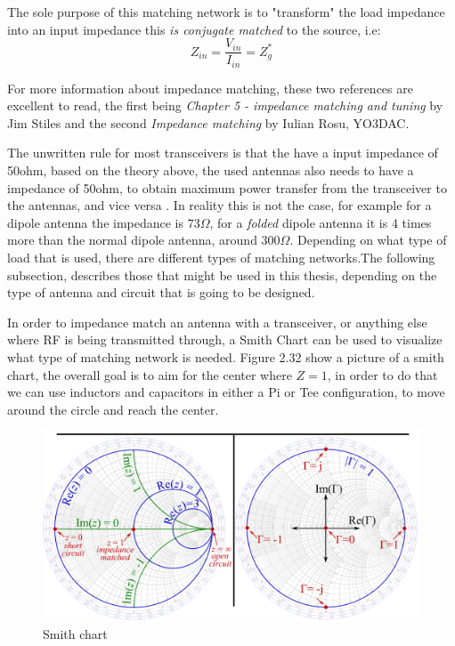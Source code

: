 The sole purpose of this matching network is to "transform" the load impedance into an input impedance this \textit{is conjugate matched} to the source, i.e:
\begin{equation}
   Z_{in} = \frac{V_{in}}{I_{in}}=Z_g^*
\end{equation}

For more information about impedance matching, these two references are excellent to read, the first being \textit{Chapter 5 - impedance matching and tuning} by Jim Stiles\cite{ImpedanceMatching1} and the second \textit{Impedance matching} by Iulian Rosu, YO3DAC\cite{ImpedanceMatching2}.

The unwritten rule for most transceivers is that the have a input impedance of 50ohm, based on the theory above, the used antennas also needs to have a impedance of 50ohm, to obtain maximum power transfer from the transceiver to the antennas, and vice versa . In reality this is not the case, for example for a dipole antenna the impedance is $73\Omega$, for a \textit{folded} dipole antenna it is 4 times more than the normal dipole antenna, around $300\Omega$. Depending on what type of load that is used, there are different types of matching networks.The following subsection, describes those that might be used in this thesis, depending on the type of antenna and circuit that is going to be designed.   

In order to impedance match an antenna with a transceiver, or anything else where RF is being transmitted through, a Smith Chart can be used to visualize what type of matching network is needed. Figure 2.32 show a picture of a smith chart, the overall goal is to aim for the center where $Z=1$, in order to do that we can use inductors and capacitors in either a Pi or Tee configuration, to move around the circle and reach the center. 

\begin{figure}[h]
\centering
\includegraphics[scale=0.4]{figures/SmithChart.png}
\caption{Smith chart\cite{SmithChart}}
\end{figure}

